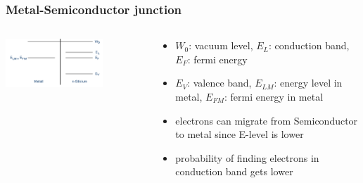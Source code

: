 \documentclass[aspectratio=1610, 9pt]{beamer}
\begin{document}
\begin{frame}\frametitle{Metal-Semiconductor junction}
  \begin{columns}
    \begin{column}[c]{0.48\textwidth}
      \includegraphics[width=0.7\textwidth]{plots/pre_m_s.png}
    \end{column}
    \begin{column}[c]{0.48\textwidth}
      \begin{itemize}
        \item $W_0$: vacuum level, $E_L$: conduction band, $E_F$: fermi energy
        \item $E_V$: valence band, $E_{LM}$: energy level in metal, $E_{FM}$: fermi energy in metal
        \item electrons can migrate from Semiconductor to metal since E-level is lower
        \item probability of finding electrons in conduction band gets lower
      \end{itemize}
    \end{column}
  \end{columns}
\end{frame}
\end{document}
